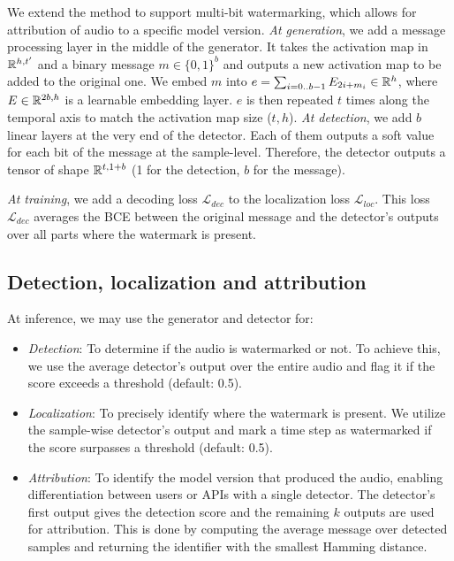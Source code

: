 We extend the method to support multi-bit watermarking, which allows for attribution of audio to a specific model version.
\emph{At generation}, we add a message processing layer in the middle of the generator.
It takes the activation map in $\mathbb{R} ^{h, t'}$ and a binary message $m\in \{0,1\} ^{b}$ and outputs a new activation map to be added to the original one.
We embed $m$ into $ e = \sum_{i=0..b-1}{E_{2i + m_i} \in \mathbb{R}^h}$, where $E\in \mathbb{R}^{2b, h}$ is a learnable embedding layer.
$e$ is then repeated $t$ times along the temporal axis to match the activation map size ($t,h$).
\emph{At detection}, we add $b$ linear layers at the very end of the detector. 
Each of them outputs a soft value for each bit of the message at the sample-level.
Therefore, the detector outputs a tensor of shape $\mathbb{R}^{t, 1+b}$ (1 for the detection, $b$ for the message).

\emph{At training}, we add a decoding loss $\mathcal{L}_{dec}$ to the localization loss $\mathcal{L}_{loc}$.
This loss $\mathcal{L}_{dec}$ averages the BCE between the original message and the detector's outputs over all parts where the watermark is present.





\subsection{Detection, localization and attribution}
At inference, we may use the generator and detector for:
\begin{itemize}
\item \emph{Detection}: To determine if the audio is watermarked or not. 
To achieve this, we use the average detector's output over the entire audio and flag it if the score exceeds a threshold (default: 0.5).
\item \emph{Localization}: To precisely identify where the watermark is present. We utilize the sample-wise detector's output and mark a time step as watermarked if the score surpasses a threshold (default: 0.5).
\item \emph{Attribution}: To identify the model version that produced the audio, enabling differentiation between users or APIs with a single detector. 
The detector's first output gives the detection score and the remaining $k$ outputs are used for attribution. 
This is done by computing the average message over detected samples and returning the identifier with the smallest Hamming distance.
\end{itemize}








